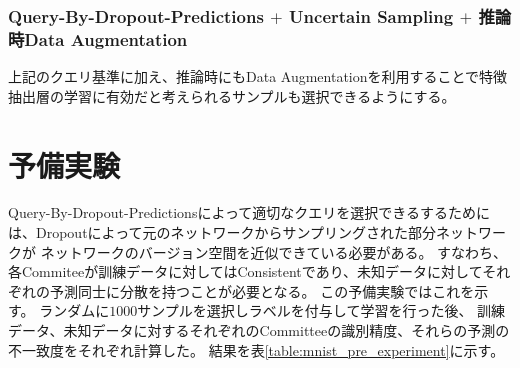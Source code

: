 \subsubsection{Query-By-Dropout-Predictions $+$ Uncertain Sampling $+$ 推論時Data Augmentation}
上記のクエリ基準に加え、推論時にもData Augmentationを利用することで特徴抽出層の学習に有効だと考えられるサンプルも選択できるようにする。


\section{予備実験}
Query-By-Dropout-Predictionsによって適切なクエリを選択できるするためには、Dropoutによって元のネットワークからサンプリングされた部分ネットワークが
ネットワークのバージョン空間を近似できている必要がある。
すなわち、各Commiteeが訓練データに対してはConsistentであり、未知データに対してそれぞれの予測同士に分散を持つことが必要となる。
この予備実験ではこれを示す。
ランダムに$1000$サンプルを選択しラベルを付与して学習を行った後、
訓練データ、未知データに対するそれぞれのCommitteeの識別精度、それらの予測の不一致度をそれぞれ計算した。
結果を表\ref{table:mnist_pre_experiment}に示す。

